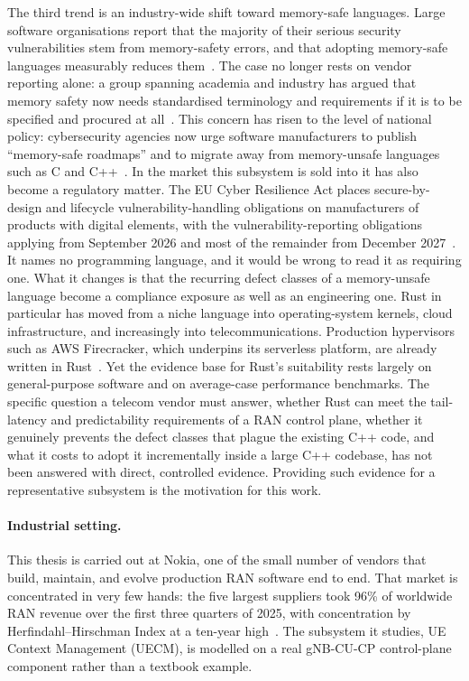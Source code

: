 \documentclass[english,oneside,a4paper,censored,csm,software-track-2020]{HYthesisML}
\begin{document}
The third trend is an industry-wide shift toward memory-safe languages. Large
software organisations report that the majority of their serious security vulnerabilities
stem from memory-safety errors, and that adopting memory-safe languages measurably reduces
them~\cite{msrc2019memory,google2022android,vanderstoep2025android,google2024securebydesign}.
The case no longer rests on vendor reporting alone: a group spanning academia and industry has
argued that memory safety now needs standardised terminology and requirements if it is to be
specified and procured at all~\cite{watson2025memorysafety}. This concern has risen to the level of national
policy: cybersecurity agencies now urge software manufacturers to publish ``memory-safe
roadmaps'' and to migrate away from memory-unsafe languages such as C and
C++~\cite{cisa2023memorysafe,oncd2024building}. In the market this subsystem is sold into it has
also become a regulatory matter. The EU Cyber Resilience Act places secure-by-design and
lifecycle vulnerability-handling obligations on manufacturers of products with digital elements,
with the vulnerability-reporting obligations applying from September 2026 and most of the
remainder from December 2027~\cite{eu2024cra}. It names no programming language, and it would be wrong to read it as
requiring one. What it changes is that the recurring defect classes of a memory-unsafe language
become a compliance exposure as well as an engineering one. Rust in particular has moved from a niche
language into operating-system kernels, cloud infrastructure, and increasingly into
telecommunications. Production hypervisors such as AWS Firecracker, which underpins its
serverless platform, are already written in Rust~\cite{agache2020firecracker}. Yet the evidence base for Rust's suitability rests largely on
general-purpose software and on average-case performance benchmarks. The specific question a
telecom vendor must answer, whether Rust can meet the tail-latency and predictability
requirements of a RAN control plane, whether it genuinely prevents the defect classes that
plague the existing C++ code, and what it costs to adopt it incrementally inside a large C++
codebase, has not been answered with direct, controlled evidence. Providing such evidence
for a representative subsystem is the motivation for this work.

\paragraph{Industrial setting.}
This thesis is carried out at Nokia, one of the small number of vendors that build, maintain,
and evolve production RAN software end to end. That market is concentrated in very few hands:
the five largest suppliers took 96\% of worldwide RAN revenue over the first three quarters of
2025, with concentration by Herfindahl--Hirschman Index at a ten-year
high~\cite{delloro2025ran3q,delloro2026ran}. The subsystem it studies, UE Context
Management (UECM), is modelled on a real gNB-CU-CP control-plane component rather than a
textbook example.
\end{document}
